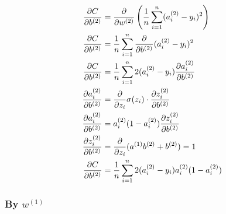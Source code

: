 \documentclass{article}
\begin{document}
\begin{align}
    \pd{C}{b^{(2)}} &= \pd{}{w^{(2)}}\left(\avgsum[i,n](a_i^{(2)} - y_i)^2\right) \\
    \pd{C}{b^{(2)}} &= \avgsum[i,n]\pd{}{b^{(2)}}(a_i^{(2)} - y_i)^2 \\
    \pd{C}{b^{(2)}} &= \avgsum[i,n]2(a_i^{(2)} - y_i)\pd{a_i^{(2)}}{b^{(2)}} \\
    \pd{a_i^{(2)}}{b^{(2)}} &= \pd{}{z_i} \sigma(z_i) \cdot \pd{z_i^{(2)}}{b^{(2)}} \\
    \pd{a_i^{(2)}}{b^{(2)}} &= a_i^{(2)}(1 - a_i^{(2)})\pd{z_i^{(2)}}{b^{(2)}} \\
    \pd{z_i^{(2)}}{b^{(2)}} &= \pd{}{z_i} (a^{(1)}b^{(2)}+b^{(2)}) = 1 \\
    \pd{C}{b^{(2)}} &= \avgsum[i,n]2(a_i^{(2)} - y_i)a_i^{(2)}(1 - a_i^{(2)}) \\
\end{align}

\subsubsection{By $w^{(1)}$}
\end{document}
